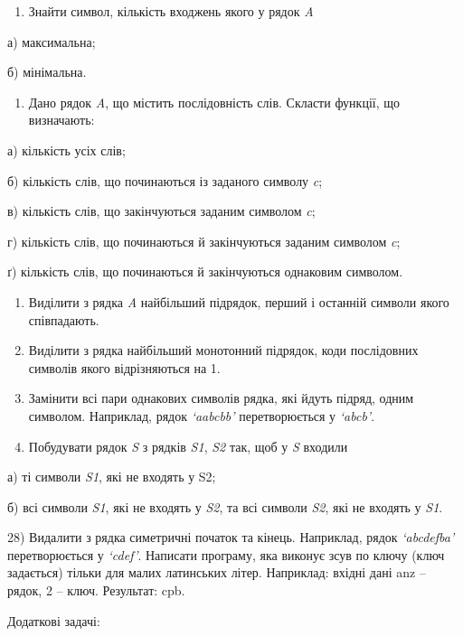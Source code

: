 \documentclass[]{article}
\begin{document}
\begin{enumerate}
\def\labelenumi{\arabic{enumi})}
\item
  Знайти символ, кількість входжень якого у рядок \emph{A}
\end{enumerate}

а) максимальна;

б) мінімальна.

\begin{enumerate}
\def\labelenumi{\arabic{enumi})}
\item
  Дано рядок \emph{A}, що містить послідовність слів. Скласти функції,
  що визначають:
\end{enumerate}

а) кількість усіх слів;

б) кількість слів, що починаються із заданого символу \emph{c};

в) кількість слів, що закінчуються заданим символом \emph{c};

г) кількість слів, що починаються й закінчуються заданим символом
\emph{c};

ґ) кількість слів, що починаються й закінчуються однаковим символом.

\begin{enumerate}
\def\labelenumi{\arabic{enumi})}
\item
  Виділити з рядка \emph{A} найбільший підрядок, перший і останній
  символи якого співпадають.
\item
  Виділити з рядка найбільший монотонний підрядок, коди послідовних
  символів якого відрізняються на 1.
\item
  Замінити всі пари однакових символів рядка, які йдуть підряд, одним
  символом. Наприклад, рядок \emph{`aabcbb'} перетворюється у
  \emph{`abcb'}.
\item
  Побудувати рядок \emph{S} з рядків \emph{S1}, \emph{S2} так, щоб у
  \emph{S} входили
\end{enumerate}

а) ті символи \emph{S1}, які не входять у S2;

б) всі символи \emph{S1}, які не входять у \emph{S2}, та всі символи
\emph{S2}, які не входять у \emph{S1}.

28) Видалити з рядка симетричні початок та кінець. Наприклад, рядок
\emph{`abcdefba'} перетворюється у \emph{`cdef'}. Написати програму, яка
виконує зсув по ключу (ключ задається) тільки для малих латинських
літер. Наприклад: вхідні дані anz -- рядок, 2 -- ключ. Результат: cpb.

Додаткові задачі:
\end{document}

